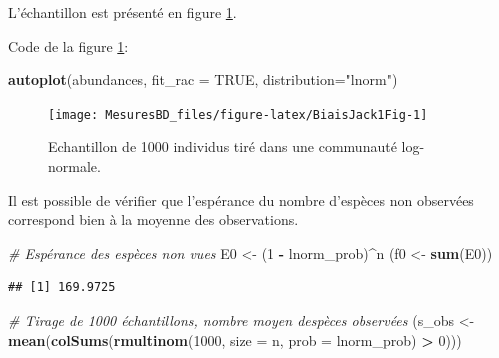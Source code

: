 \documentclass[
  11pt,
  american,
  a4paper,
  extrafontsizes,onecolumn,openright
  ]{memoir}
\newenvironment{Shaded}{\begin{snugshade}}{\end{snugshade}}
\newcommand{\AttributeTok}[1]{\textcolor[rgb]{0.13,0.29,0.53}{#1}}
\newcommand{\CommentTok}[1]{\textcolor[rgb]{0.56,0.35,0.01}{\textit{#1}}}
\newcommand{\ConstantTok}[1]{\textcolor[rgb]{0.56,0.35,0.01}{#1}}
\newcommand{\DecValTok}[1]{\textcolor[rgb]{0.00,0.00,0.81}{#1}}
\newcommand{\FunctionTok}[1]{\textcolor[rgb]{0.13,0.29,0.53}{\textbf{#1}}}
\newcommand{\NormalTok}[1]{#1}
\newcommand{\OtherTok}[1]{\textcolor[rgb]{0.56,0.35,0.01}{#1}}
\newcommand{\SpecialCharTok}[1]{\textcolor[rgb]{0.81,0.36,0.00}{\textbf{#1}}}
\newcommand{\StringTok}[1]{\textcolor[rgb]{0.31,0.60,0.02}{#1}}
\begin{document}
\normalsize

L'échantillon est présenté en figure \ref{fig:BiaisJack1Fig}.

Code de la figure \ref{fig:BiaisJack1Fig}:

\scriptsize

\begin{Shaded}
\begin{Highlighting}[]
\FunctionTok{autoplot}\NormalTok{(abundances, }\AttributeTok{fit\_rac =} \ConstantTok{TRUE}\NormalTok{, }\AttributeTok{distribution=}\StringTok{"lnorm"}\NormalTok{)}
\end{Highlighting}
\end{Shaded}

\normalsize

\scriptsize

\begin{figure}

{\centering \texttt{[image: MesuresBD\_files/figure-latex/BiaisJack1Fig-1]} 

}

\caption{Echantillon de 1000 individus tiré dans une communauté log-normale.}\label{fig:BiaisJack1Fig}
\end{figure}

\normalsize

Il est possible de vérifier que l'espérance du nombre d'espèces non observées correspond bien à la moyenne des observations.

\scriptsize

\begin{Shaded}
\begin{Highlighting}[]
\CommentTok{\# Espérance des espèces non vues}
\NormalTok{E0 }\OtherTok{\textless{}{-}}\NormalTok{ (}\DecValTok{1} \SpecialCharTok{{-}}\NormalTok{ lnorm\_prob)}\SpecialCharTok{\^{}}\NormalTok{n}
\NormalTok{(f0 }\OtherTok{\textless{}{-}} \FunctionTok{sum}\NormalTok{(E0))}
\end{Highlighting}
\end{Shaded}

\begin{verbatim}
## [1] 169.9725
\end{verbatim}

\begin{Shaded}
\begin{Highlighting}[]
\CommentTok{\# Tirage de 1000 échantillons, nombre moyen d\textquotesingle{}espèces observées}
\NormalTok{(s\_obs }\OtherTok{\textless{}{-}} \FunctionTok{mean}\NormalTok{(}\FunctionTok{colSums}\NormalTok{(}\FunctionTok{rmultinom}\NormalTok{(}\DecValTok{1000}\NormalTok{, }\AttributeTok{size =}\NormalTok{ n, }\AttributeTok{prob =}\NormalTok{ lnorm\_prob) }\SpecialCharTok{\textgreater{}} \DecValTok{0}\NormalTok{)))}
\end{Highlighting}
\end{Shaded}
\end{document}
